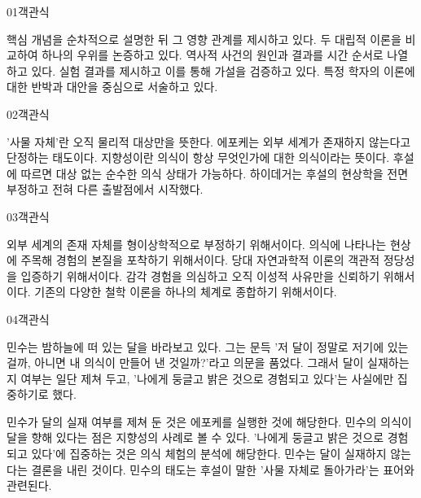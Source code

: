 \documentclass[fs85,seriesWit]{korfarm-base}
\begin{document}
\kfBeginMC
\begin{kfQBlock}{01}{객관식}
\begin{kfChoices}
\kfChoice 핵심 개념을 순차적으로 설명한 뒤 그 영향 관계를 제시하고 있다.
\kfChoice 두 대립적 이론을 비교하여 하나의 우위를 논증하고 있다.
\kfChoice 역사적 사건의 원인과 결과를 시간 순서로 나열하고 있다.
\kfChoice 실험 결과를 제시하고 이를 통해 가설을 검증하고 있다.
\kfChoice 특정 학자의 이론에 대한 반박과 대안을 중심으로 서술하고 있다.
\end{kfChoices}
\end{kfQBlock}

\begin{kfQBlock}{02}{객관식}
\begin{kfChoices}
\kfChoice '사물 자체'란 오직 물리적 대상만을 뜻한다.
\kfChoice 에포케는 외부 세계가 존재하지 않는다고 단정하는 태도이다.
\kfChoice 지향성이란 의식이 항상 무엇인가에 대한 의식이라는 뜻이다.
\kfChoice 후설에 따르면 대상 없는 순수한 의식 상태가 가능하다.
\kfChoice 하이데거는 후설의 현상학을 전면 부정하고 전혀 다른 출발점에서 시작했다.
\end{kfChoices}
\end{kfQBlock}

\begin{kfQBlock}{03}{객관식}
\begin{kfChoices}
\kfChoice 외부 세계의 존재 자체를 형이상학적으로 부정하기 위해서이다.
\kfChoice 의식에 나타나는 현상에 주목해 경험의 본질을 포착하기 위해서이다.
\kfChoice 당대 자연과학적 이론의 객관적 정당성을 입증하기 위해서이다.
\kfChoice 감각 경험을 의심하고 오직 이성적 사유만을 신뢰하기 위해서이다.
\kfChoice 기존의 다양한 철학 이론을 하나의 체계로 종합하기 위해서이다.
\end{kfChoices}
\end{kfQBlock}

\begin{kfQBlock}{04}{객관식}
\begin{kfEvidence}민수는 밤하늘에 떠 있는 달을 바라보고 있다. 그는 문득 '저 달이 정말로 저기에 있는 걸까, 아니면 내 의식이 만들어 낸 것일까?'라고 의문을 품었다. 그래서 달이 실재하는지 여부는 일단 제쳐 두고, '나에게 둥글고 밝은 것으로 경험되고 있다'는 사실에만 집중하기로 했다.\end{kfEvidence}
\begin{kfChoices}
\kfChoice 민수가 달의 실재 여부를 제쳐 둔 것은 에포케를 실행한 것에 해당한다.
\kfChoice 민수의 의식이 달을 향해 있다는 점은 지향성의 사례로 볼 수 있다.
\kfChoice '나에게 둥글고 밝은 것으로 경험되고 있다'에 집중하는 것은 의식 체험의 분석에 해당한다.
\kfChoice 민수는 달이 실재하지 않는다는 결론을 내린 것이다.
\kfChoice 민수의 태도는 후설이 말한 '사물 자체로 돌아가라'는 표어와 관련된다.
\end{kfChoices}
\end{kfQBlock}
\end{document}
